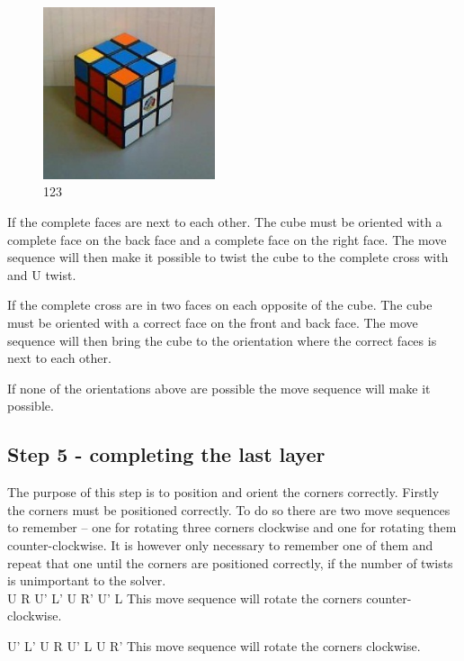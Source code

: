 \begin{figure}
\begin{center}
	\includegraphics[width=0.45\textwidth]{input/pics/7LLedges.jpg}	
\end{center}
\caption{123}
\label{fig:7LLedges}
\end{figure}

If the complete faces are next to each other. The cube must be oriented with a complete face on the back face and a complete face on the right face. The move sequence will then make it possible to twist the cube to the complete cross with and U twist.

If the complete cross are in two faces on each opposite of the cube. The cube must be oriented with a correct face on the front and back face. The move sequence will then bring the cube to the orientation where the correct faces is next to each other.

If none of the orientations above are possible the move sequence will make it possible.

\subsection{Step 5 - completing the last layer}
The purpose of this step is to position and orient the corners correctly. Firstly the corners must be positioned correctly. To do so there are two move sequences to remember -- one for rotating three corners clockwise and one for rotating them counter-clockwise. It is however only necessary to remember one of them and repeat that one until the corners are positioned correctly, if the number of twists is unimportant to the solver. \\

U R U' L' U R' U' L
This move sequence will rotate the corners counter-clockwise.

U' L' U R U' L U R'
This move sequence will rotate the corners clockwise.

